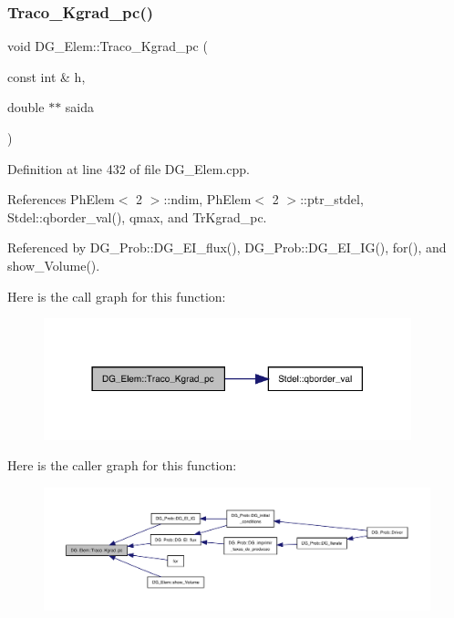 \subsubsection{\texorpdfstring{Traco\+\_\+\+Kgrad\+\_\+pc()}{Traco\_Kgrad\_pc()}}
{\footnotesize\ttfamily void D\+G\+\_\+\+Elem\+::\+Traco\+\_\+\+Kgrad\+\_\+pc (\begin{DoxyParamCaption}\item[{const int \&}]{h,  }\item[{double $\ast$$\ast$}]{saida }\end{DoxyParamCaption})}



Definition at line 432 of file D\+G\+\_\+\+Elem.\+cpp.



References Ph\+Elem$<$ 2 $>$\+::ndim, Ph\+Elem$<$ 2 $>$\+::ptr\+\_\+stdel, Stdel\+::qborder\+\_\+val(), qmax, and Tr\+Kgrad\+\_\+pc.



Referenced by D\+G\+\_\+\+Prob\+::\+D\+G\+\_\+\+E\+I\+\_\+flux(), D\+G\+\_\+\+Prob\+::\+D\+G\+\_\+\+E\+I\+\_\+\+I\+G(), for(), and show\+\_\+\+Volume().

Here is the call graph for this function\+:
\nopagebreak
\begin{figure}[H]
\begin{center}
\leavevmode
\includegraphics[width=302pt]{classDG__Elem_ad288d45acae59787b21a35b38fe47b10_cgraph}
\end{center}
\end{figure}
Here is the caller graph for this function\+:
\nopagebreak
\begin{figure}[H]
\begin{center}
\leavevmode
\includegraphics[width=350pt]{classDG__Elem_ad288d45acae59787b21a35b38fe47b10_icgraph}
\end{center}
\end{figure}
\mbox{\label{classDG__Elem_a0109cc28854e31b5df555513e9fccfed}} 

